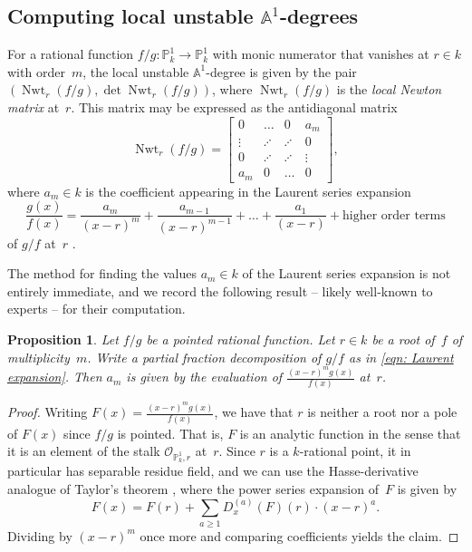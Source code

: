 \documentclass[12pt]{amsart}
\newtheorem{proposition}[theorem]{Proposition}
\theoremstyle{definition}
\DeclareMathOperator{\Nwt}{Nwt}
\begin{document}
\subsection{Computing local unstable \texorpdfstring{$\mathbb{A}^{1}$}{A\textonesuperior}-degrees}\label{subsec: unstable local degrees}
For a rational function $f/g\colon\mathbb{P}^{1}_{k}\to\mathbb{P}^{1}_{k}$ with monic numerator that vanishes at $r\in k$ with order~$m$, the local unstable $\mathbb{A}^{1}$-degree is given by the pair $(\Nwt_{r}(f/g),\det\Nwt_{r}(f/g))$, where $\Nwt_{r}(f/g)$ is the \textit{local Newton matrix} at~$r$. This matrix may be expressed as the antidiagonal matrix
\[\Nwt_{r}(f/g)=\begin{bmatrix}
    0 & \dots & 0 & a_{m} \\
    \vdots & \iddots & \iddots & 0 \\
    0 & \iddots & \iddots & \vdots \\
    a_{m} & 0 & \dots & 0
\end{bmatrix},\]
where $a_{m} \in k$ is the coefficient appearing in the Laurent series expansion 
\begin{equation}\label{eqn: Laurent expansion}
    \frac{g(x)}{f(x)}=\frac{a_{m}}{(x-r)^{m}}+\frac{a_{m-1}}{(x-r)^{m-1}}+\dots+\frac{a_{1}}{(x-r)}+\text{higher order terms}
\end{equation}
of $g/f$ at~$r$ \cite[Lemma~3.10]{IMSTW}. 

The method for finding the values $a_{m}\in k$ of the Laurent series expansion is not entirely immediate, and we record the following result -- likely well-known to experts -- for their computation. 

\begin{proposition}\label{prop: computation of higher residues}
Let $f/g$ be a pointed rational function. Let $r\in k$ be a root of~$f$ of multiplicity~$m$. Write a partial fraction decomposition of $g/f$ as in \eqref{eqn: Laurent expansion}. Then $a_{m}$ is given by the evaluation of $\frac{(x-r)^{m}g(x)}{f(x)}$ at~$r$.
\end{proposition}

\begin{proof}
Writing $F(x)=\frac{(x-r)^{m}g(x)}{f(x)}$, we have that $r$ is neither a root nor a pole of $F(x)$ since $f/g$ is pointed. That is, $F$ is an analytic function in the sense that it is an element of the stalk $\mathcal{O}_{\mathbb{P}^{1}_{k},r}$ at~$r$. Since $r$ is a $k$-rational point, it in particular has separable residue field, and we can use the Hasse-derivative analogue of Taylor's theorem \cite[Corollary~2.5.14]{Goldschmidt}, where the power series expansion of~$F$ is given by
\[F(x)=F(r)+\sum_{a\geq 1}D^{(a)}_{x}(F)(r)\cdot (x-r)^{a}.\]
Dividing by $(x-r)^{m}$ once more and comparing coefficients yields the claim. 
\end{proof}
\end{document}
